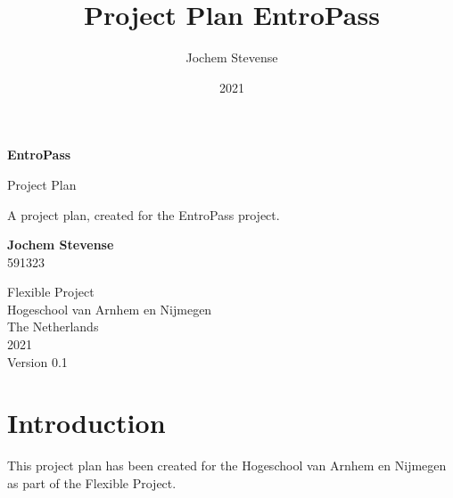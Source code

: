 \documentclass[a4paper,12pt]{article}
\title{Project Plan EntroPass}
\author{Jochem Stevense}
\date{2021}
\begin{document}
\pagestyle{headings}



\begin{titlepage}
  \begin{center}
    \vspace*{1cm}

    \Huge
    \textbf{EntroPass}

    \vspace{0.5cm}
    \LARGE
    Project Plan

    \vspace{2.5cm}
    A project plan, created for the EntroPass project.

    \vfill



    \vspace{0.8cm}



  \end{center}
  \textbf{Jochem Stevense}\\
  \vspace{0.5cm}
  591323
  
  \vspace{0.8cm}

  Flexible Project\\
  Hogeschool van Arnhem en Nijmegen\\
  The Netherlands\\
  2021\\
  Version 0.1\\
\end{titlepage}

\tableofcontents
\newpage

\section{Introduction}
This project plan has been created for the Hogeschool van Arnhem en Nijmegen as part of the Flexible Project.\\
\end{document}
